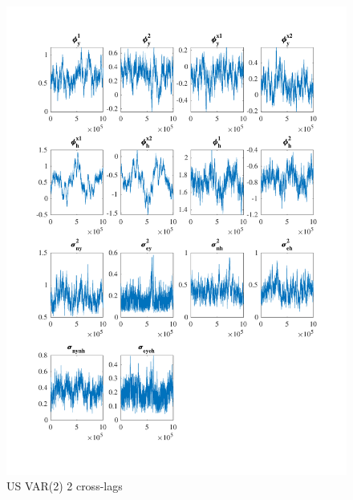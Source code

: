 \documentclass[
  12pt,
]{article}
\begin{document}
\begin{figure}

{\centering \includegraphics[width=0.85\linewidth]{../../Regression/Bayesian_UC_VAR2_nodrift_Crosscycle2lags/OutputData/posteriorchain_US} 

}

\caption{US VAR(2) 2 cross-lags}\label{fig:unnamed-chunk-20}
\end{figure}
\end{document}
